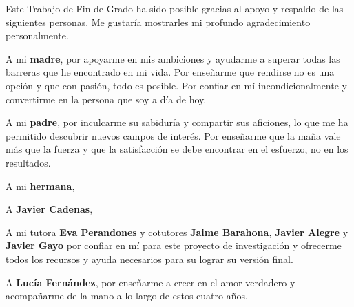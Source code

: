 \thispagestyle{empty}




\vspace{-1.8cm}

Este Trabajo de Fin de Grado ha sido posible gracias al apoyo y respaldo de las siguientes personas. Me gustaría mostrarles mi profundo agradecimiento personalmente.

A mi \textbf{madre}, por apoyarme en mis ambiciones y ayudarme a superar todas las barreras que he encontrado en mi vida. Por enseñarme que rendirse no es una opción y que con pasión, todo es posible. Por confiar en mí incondicionalmente y convertirme en la persona que soy a día de hoy.

A mi \textbf{padre}, por inculcarme su sabiduría y compartir sus aficiones, lo que me ha permitido descubrir nuevos campos de interés. Por enseñarme que la maña vale más que la fuerza y que la satisfacción se debe encontrar en el esfuerzo, no en los resultados.

A mi \textbf{hermana}, 

A \textbf{Javier Cadenas},

A mi tutora \textbf{Eva Perandones} y cotutores \textbf{Jaime Barahona}, \textbf{Javier Alegre} y \textbf{Javier Gayo} por confiar en mí para este proyecto de investigación y ofrecerme todos los recursos y ayuda necesarios para su lograr su versión final. 

A \textbf{Lucía Fernández}, por enseñarme a creer en el amor verdadero y acompañarme de la mano a lo largo de estos cuatro años.
